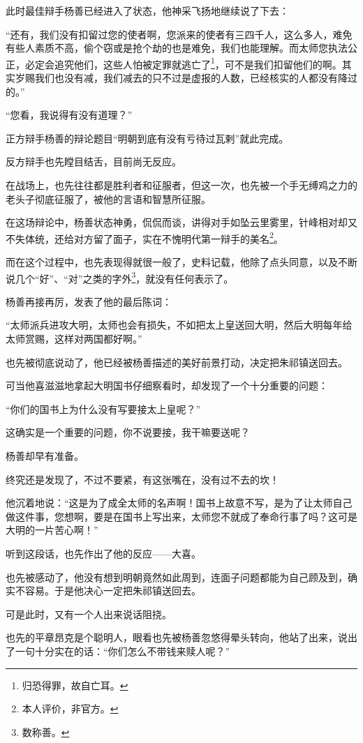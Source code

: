 \begin{multicols}{\theparacolNo}
此时最佳辩手杨善已经进入了状态，他神采飞扬地继续说了下去：

“还有，我们没有扣留过您的使者啊，您派来的使者有三四千人，这么多人，难免有些人素质不高，偷个窃或是抢个劫的也是难免，我们也能理解。而太师您执法公正，必定会追究他们，这些人怕被定罪就逃亡了\footnote{归恐得罪，故自亡耳。}，可不是我们扣留他们的啊。其实岁赐我们也没有减，我们减去的只不过是虚报的人数，已经核实的人都没有降过的。”

“您看，我说得有没有道理？”

正方辩手杨善的辩论题目“明朝到底有没有亏待过瓦剌”就此完成。

反方辩手也先瞠目结舌，目前尚无反应。

在战场上，也先往往都是胜利者和征服者，但这一次，也先被一个手无缚鸡之力的老头子彻底征服了，被他的言语和智慧所征服。

在这场辩论中，杨善状态神勇，侃侃而谈，讲得对手如坠云里雾里，针峰相对却又不失体统，还给对方留了面子，实在不愧明代第一辩手的美名\footnote{本人评价，非官方。}。

而在这个过程中，也先表现得就很一般了，史料记载，他除了点头同意，以及不断说几个“好”、“对”之类的字外\footnote{数称善。}，就没有任何表示了。

杨善再接再厉，发表了他的最后陈词：

“太师派兵进攻大明，太师也会有损失，不如把太上皇送回大明，然后大明每年给太师赏赐，这样对两国都好啊。”

也先被彻底说动了，他已经被杨善描述的美好前景打动，决定把朱祁镇送回去。

可当他喜滋滋地拿起大明国书仔细察看时，却发现了一个十分重要的问题：

“你们的国书上为什么没有写要接太上皇呢？”

这确实是一个重要的问题，你不说要接，我干嘛要送呢？

杨善却早有准备。

终究还是发现了，不过不要紧，有这张嘴在，没有过不去的坎！

他沉着地说：“这是为了成全太师的名声啊！国书上故意不写，是为了让太师自己做这件事，您想啊，要是在国书上写出来，太师您不就成了奉命行事了吗？这可是大明的一片苦心啊！”

听到这段话，也先作出了他的反应——大喜。

也先被感动了，他没有想到明朝竟然如此周到，连面子问题都能为自己顾及到，确实不容易。于是他决心一定把朱祁镇送回去。

可是此时，又有一个人出来说话阻挠。

也先的平章昂克是个聪明人，眼看也先被杨善忽悠得晕头转向，他站了出来，说出了一句十分实在的话：“你们怎么不带钱来赎人呢？”


\end{multicols}
